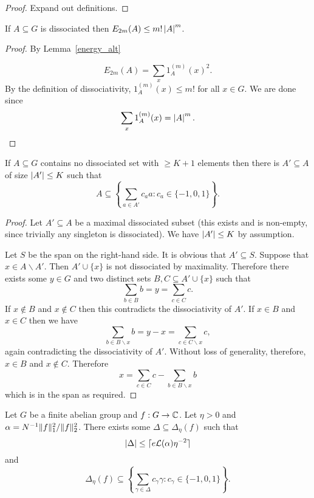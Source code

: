\begin{proof}
Expand out definitions.
\end{proof}


\begin{lemma}
\label{diss_energy}
If $A\subseteq G$ is dissociated then $E_{2m}(A) \leq m! \left\lvert A\right\rvert^m$.
\end{lemma}
\begin{proof}
By Lemma~\ref{energy_alt}

\[E_{2m}(A) = \sum_x 1_A^{(m)}(x)^2.\]
By the definition of dissociativity, $1_A^{(m)}(x)\leq m!$ for all $x\in G$. We are done since
\[ \sum_x 1_A^{(m)}(x) = \left\lvert A\right\rvert^m.\]
\end{proof}


\begin{lemma}
\label{diss_span}
\leanok
If $A\subseteq G$ contains no dissociated set with $\geq K+1$ elements then there is $A'\subseteq A$ of size $\left\lvert A'\right\rvert\leq K$ such that
\[A\subseteq \left\{ \sum_{a\in A'}c_aa : c_a\in \{-1,0,1\} \right\}.\]
\end{lemma}

\begin{proof}
\leanok
Let $A'\subseteq A$ be a maximal dissociated subset (this exists and is non-empty, since trivially any singleton is dissociated). We have $\left\lvert A'\right\rvert\leq K$ by assumption.

Let $S$ be the span on the right-hand side. It is obvious that $A'\subseteq S$. Suppose that $x\in A\backslash A'$. Then $A'\cup\{x\}$ is not dissociated by maximality. Therefore there exists some $y\in G$ and two distinct sets $B,C\subseteq A'\cup \{x\}$ such that
\[\sum_{b\in B}b = y = \sum_{c\in C} c.\]
If $x\not\in B$ and $x\not\in C$ then this contradicts the dissociativity of $A'$. If $x\in B$ and $x\in C$ then we have
\[\sum_{b\in B\backslash x}b=y-x=\sum_{c\in C\backslash x}c,\]
again contradicting the dissociativity of $A'$. Without loss of generality, therefore, $x\in B$ and $x\not\in C$. Therefore
\[x=\sum_{c\in C}c - \sum_{b\in B\backslash x}b\]
which is in the span as required.
\end{proof}


\begin{theorem}
\label{chang}
Let $G$ be a finite abelian group and $f:G\to \mathbb{C}$. Let $\eta >0$ and $\alpha=N^{-1}\lVert f\rVert_1^2/\lVert f\rVert_2^2$. There exists some $\Delta\subseteq \Delta_\eta(f)$ such that
\[\left\lvert \Delta\right\rvert\leq \lceil e\mathcal{L}(\alpha)\eta^{-2}\rceil \]
and
\[\Delta_\eta(f)\subseteq \left\{ \sum_{\gamma\in\Delta}c_\gamma \gamma : c_\gamma\in \{-1,0,1\} \right\}.\]
\end{theorem}

